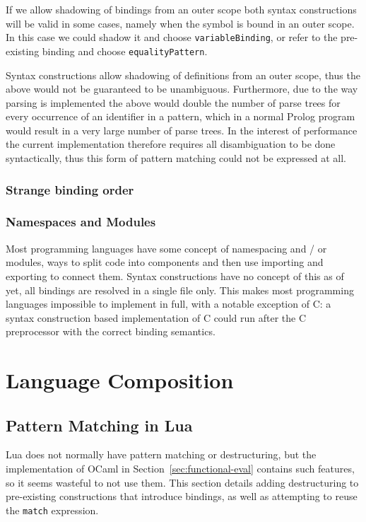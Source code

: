 \documentclass{kththesis}
\begin{document}
If we allow shadowing of bindings from an outer scope both syntax constructions will be valid in some cases, namely when the symbol is bound in an outer scope. In this case we could shadow it and choose \texttt{variableBinding}, or refer to the pre-existing binding and choose \texttt{equalityPattern}.

Syntax constructions allow shadowing of definitions from an outer scope, thus the above would not be guaranteed to be unambiguous. Furthermore, due to the way parsing is implemented the above would double the number of parse trees for every occurrence of an identifier in a pattern, which in a normal Prolog program would result in a very large number of parse trees. In the interest of performance the current implementation therefore requires all disambiguation to be done syntactically, thus this form of pattern matching could not be expressed at all.

\subsubsection{Strange binding order}

\subsubsection{Namespaces and Modules}

Most programming languages have some concept of namespacing and / or modules, ways to split code into components and then use importing and exporting to connect them. Syntax constructions have no concept of this as of yet, all bindings are resolved in a single file only. This makes most programming languages impossible to implement in full, with a notable exception of C: a syntax construction based implementation of C could run after the C preprocessor with the correct binding semantics.


\section{Language Composition}

\subsection{Pattern Matching in Lua}

Lua does not normally have pattern matching or destructuring, but the implementation of OCaml in Section~\ref{sec:functional-eval} contains such features, so it seems wasteful to not use them. This section details adding destructuring to pre-existing constructions that introduce bindings, as well as attempting to reuse the \texttt{match} expression.
\end{document}
